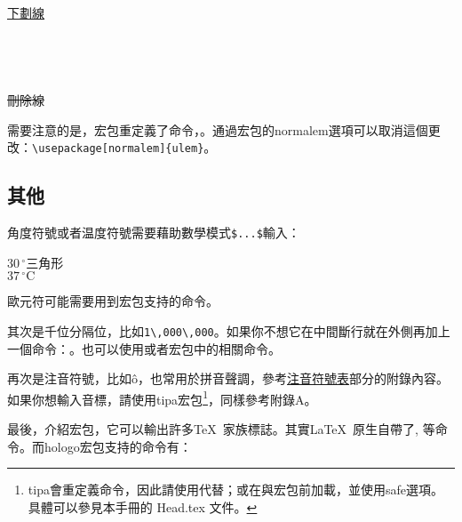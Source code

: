 \begin{codeshow}
\uline{下劃線} \\
 \\
 \\
 \\
 \\
\sout{刪除線} \\
\end{codeshow}

需要注意的是，宏包重定義了命令，。通過宏包的normalem選項可以取消這個更改：\verb|\usepackage[normalem]{ulem}|。

\subsection{其他}
角度符號或者温度符號需要藉助數學模式\verb|$...$|輸入：

\begin{codeshow}
$30\,^{\circ}$三角形 \\
$37\,^{\circ}\mathrm{C}$
\end{codeshow}

歐元符可能需要用到宏包支持的命令。

其次是千位分隔位，比如\verb|1\,000\,000|。如果你不想它在中間斷行就在外側再加上一個命令：。也可以使用或者宏包中的相關命令。

再次是注音符號，比如\^o，也常用於拼音聲調，參考\hyperref[app:phonetic]{注音符號表}部分的附錄內容。如果你想輸入音標，請使用tipa宏包\footnote{tipa會重定義\latexline{!}命令，因此請使用代替；或在與宏包前加載，並使用safe選項。具體可以參見本手冊的 Head.tex 文件。}，同樣參考附錄A。

最後，介紹宏包，它可以輸出許多\TeX\ 家族標誌。其實\LaTeX\ 原生自帶了, 等命令。而hologo宏包支持的命令有：

\begin{codeshow}
 
\end{codeshow}

